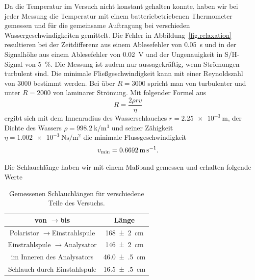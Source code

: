 \documentclass[paper=a4,
	fontsize=10pt,
	DIV=18,
	twocolumn,
	parskip=half
	]{scrartcl}
\numberwithin{equation}{section}    %
\newcommand{\tra}{$\rightarrow$}
\begin{document}
Da die Temperatur im Versuch nicht konstant gehalten konnte, haben wir bei jeder Messung die Temperatur mit einem batteriebetriebenen Thermometer gemessen und für die gemeinsame Auftragung bei verschieden Wassergeschwindigkeiten gemittelt. Die Fehler in Abbildung~\ref{fig.relaxation} resultieren bei der Zeitdifferenz aus einem Ablesefehler von \SI{0.05}{\second} und in der Signalhöhe aus einem Ablesefehler von \SI{0.02}{\volt} und der Ungenauigkeit in S/H-Signal von \SI{5}{\percent}.
Die Messung ist zudem nur aussagekräftig, wenn Strömungen turbulent sind. Die minimale Fließgeschwindigkeit kann mit einer Reynoldszahl von 3000 bestimmt werden. Bei über $R = 3000$ spricht man von turbulenter und unter $R=2000$ von laminarer Strömung. Mit folgender Formel aus~\citet{anleitung}
\begin{equation}
	R=\frac{2\rho rv}{\eta}
\end{equation}
ergibt sich mit dem Innenradius des Wasserschlauches $r=\SI{2.25e-3}{\meter}$, der Dichte des Wassers $\rho=\SI{998.2}{\kilo\per\meter^3}$ und seiner Zähigkeit $\eta = \SI{1.002e-3}{\newton\second\per\meter\squared}$ die minimale Flussgeschwindigkeit
\begin{equation}
	v_{\rm min} = \SI{0.6692}{\meter\per\second}.
	\label{eq.vmin}
\end{equation}

Die Schlauchlänge haben wir mit einem Maßband gemessen und erhalten folgende Werte

\begin{table}[htp]
	\begin{center}
	\begin{tabular}{cc}
		\hline
		von \tra bis & Länge \\
		\hline
		Polaristor \tra Einstrahlspule & \SI{168(2)}{\centi\meter}\\
		Einstrahlspule \tra Analysator & \SI{146(2)}{\centi\meter}\\
		im Inneren des Analysators & \SI{46.0(5)}{\centi\meter}\\
		Schlauch durch Einstahlspule & \SI{16.5(5)}{\centi\meter}\\
		\hline
	\end{tabular}
	\caption{Gemessenen Schlauchlängen für verschiedene Teile des Versuchs.}
	\label{tab.schlauch}
	\end{center}
\end{table}
\end{document}
